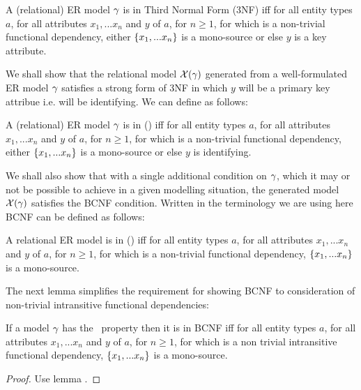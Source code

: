 \begin{definition} %
A (relational) ER model $\gamma$ is in  Third Normal Form (3NF)  iff
for all entity types $a$, for all attributes $x_1,...x_n$ and $y$ of $a$, for $n \geq 1$, 
for which   is a non-trivial functional dependency, 
either $\left\{x_1,...x_n\right\}$ is a mono-source or else $y$ is a key attribute.
\end{definition}


We shall show that the relational model $\mathcal{X}(\gamma)$ generated from a well-formulated 
ER model $\gamma$ satisfies a strong form of 3NF in which $y$ will be a primary key attribue i.e. will be identifying.
We can define as follows:

\begin{definition} %
A (relational) ER model $\gamma$ is in  ()  iff
for all entity types $a$, for all attributes $x_1,...x_n$ and $y$ of $a$, for $n \geq 1$, 
for which   is a non-trivial functional dependency, 
either $\left\{x_1,...x_n\right\}$ is a mono-source or else $y$ is identifying.
\end{definition}

We shall also show that with a single additional condition on $\gamma$, which it may or not be possible to achieve in a given modelling situation,
the generated model $\mathcal{X}(\gamma)$ satisfies the BCNF condition.
Written in the terminology we are using here BCNF can be defined as follows:
\begin{definition} %
A relational ER model is in  ()  iff
for all entity types $a$, for all attributes $x_1,...x_n$ and $y$ of $a$, for $n \geq 1$, 
for which   is a non-trivial functional dependency, 
$\left\{x_1,...x_n\right\}$ is a mono-source.  
\end{definition}

\noindent The next lemma simplifies the requirement for showing BCNF to consideration of non-trivial
intransitive functional dependencies:

\begin{lemma}
If a model $\gamma$ has the \fdfactoring\ property then it is in BCNF iff
for all entity types $a$, for all attributes $x_1,...x_n$ and $y$ of $a$, for $n \geq 1$, 
for which  is a non trivial  intransitive functional dependency,
$\left\{x_1,...x_n\right\}$ is a mono-source. 
\end{lemma}
\begin{proof}Use lemma .
\end{proof}

